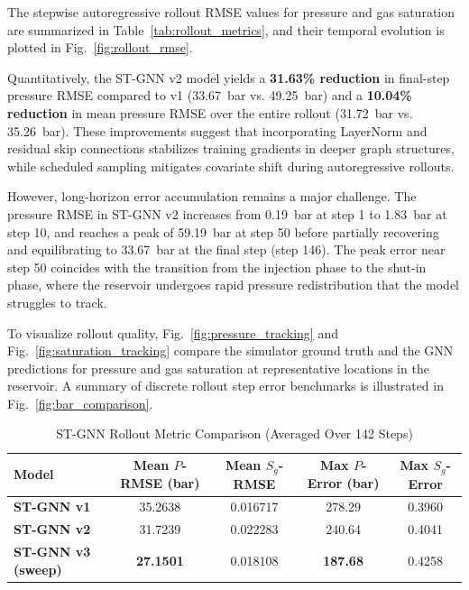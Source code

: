 The stepwise autoregressive rollout RMSE values for pressure and gas saturation are summarized in Table~\ref{tab:rollout_metrics}, and their temporal evolution is plotted in Fig.~\ref{fig:rollout_rmse}.

Quantitatively, the ST-GNN v2 model yields a \textbf{31.63\% reduction} in final-step pressure RMSE compared to v1 (33.67~bar vs. 49.25~bar) and a \textbf{10.04\% reduction} in mean pressure RMSE over the entire rollout (31.72~bar vs. 35.26~bar). These improvements suggest that incorporating LayerNorm and residual skip connections stabilizes training gradients in deeper graph structures, while scheduled sampling mitigates covariate shift during autoregressive rollouts.

However, long-horizon error accumulation remains a major challenge. The pressure RMSE in ST-GNN v2 increases from 0.19~bar at step 1 to 1.83~bar at step 10, and reaches a peak of 59.19~bar at step 50 before partially recovering and equilibrating to 33.67~bar at the final step (step 146). The peak error near step 50 coincides with the transition from the injection phase to the shut-in phase, where the reservoir undergoes rapid pressure redistribution that the model struggles to track. 

To visualize rollout quality, Fig.~\ref{fig:pressure_tracking} and Fig.~\ref{fig:saturation_tracking} compare the simulator ground truth and the GNN predictions for pressure and gas saturation at representative locations in the reservoir. A summary of discrete rollout step error benchmarks is illustrated in Fig.~\ref{fig:bar_comparison}.

\begin{table}[t]
\centering
\caption{ST-GNN Rollout Metric Comparison (Averaged Over 142 Steps)}
\label{tab:stgnn_comparison}
\begin{tabular}{lcccc}
\toprule
\textbf{Model} & \textbf{Mean $P$-RMSE (bar)} & \textbf{Mean $S_g$-RMSE} & \textbf{Max $P$-Error (bar)} & \textbf{Max $S_g$-Error} \\
\midrule
\textbf{ST-GNN v1} & 35.2638 & 0.016717 & 278.29 & 0.3960 \\
\textbf{ST-GNN v2} & 31.7239 & 0.022283 & 240.64 & 0.4041 \\
\textbf{ST-GNN v3 (sweep)} & \textbf{27.1501} & 0.018108 & \textbf{187.68} & 0.4258 \\
\bottomrule
\end{tabular}
\end{table}

